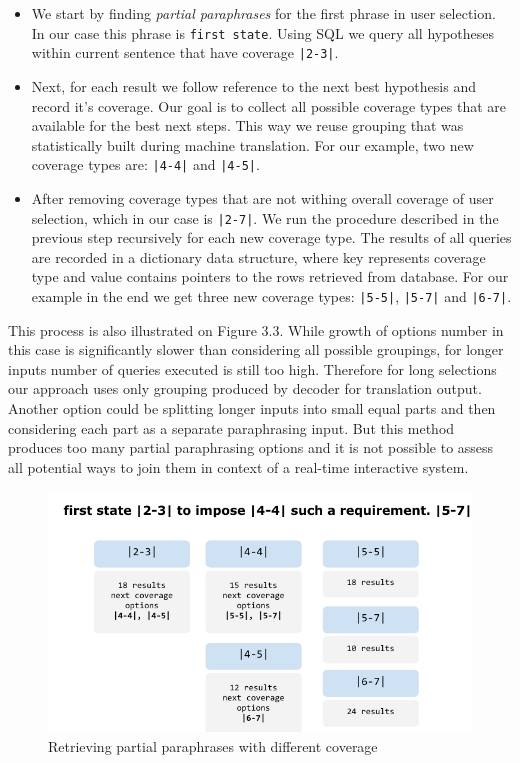 \begin{itemize}
    \item We start by finding \emph{partial paraphrases} for the first phrase in user selection. In our case this phrase is \texttt{first state}. Using SQL we query all hypotheses within current sentence that have coverage \texttt{|2-3|}. 
    \item Next, for each result we follow reference to the next best hypothesis and record it's coverage. Our goal is to collect all possible coverage types that are available for the best next steps. This way we reuse grouping that was statistically built during machine translation. For our example, two new coverage types are: \texttt{|4-4|} and \texttt{|4-5|}.
    \item After removing coverage types that are not withing overall coverage of user selection, which in our case is \texttt{|2-7|}. We run the procedure described in the previous step recursively for each new coverage type. The results of all queries are recorded in a dictionary data structure, where key represents coverage type and value contains pointers to the rows retrieved from database. For our example in the end we get three new coverage types: \texttt{|5-5|}, \texttt{|5-7|} and \texttt{|6-7|}. 
\end{itemize}

This process is also illustrated on Figure 3.3. While growth of options number in this case is significantly slower than considering all possible groupings, for longer inputs number of queries executed is still too high. Therefore for long selections our approach uses only grouping produced by decoder for translation output. Another option could be splitting longer inputs into small equal parts and then considering each part as a separate paraphrasing input. But this method produces too many partial paraphrasing options and it is not possible to assess all potential ways to join them in context of a real-time interactive system. 
 
\begin{figure}
 \centering 
 \includegraphics{g/coverage-expansion.pdf}
 \caption{Retrieving partial paraphrases with different coverage}
\end{figure}

